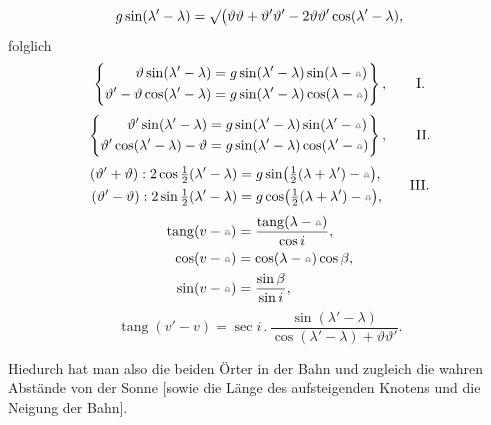 \[
g\sin(\lambda'-\lambda)=\surd\bigl(\vartheta\vartheta+\vartheta'\vartheta'-2\vartheta\vartheta'\cos(\lambda'-\lambda),
\]
\noindent folglich
\begin{equation}
\left\{\begin{aligned}
\vartheta\sin(\lambda'-\lambda)&=g\sin(\lambda'-\lambda)\sin(\lambda-\AstNode)\\
\vartheta'-\vartheta\cos(\lambda'-\lambda)&=g\sin(\lambda'-\lambda)\cos(\lambda-\AstNode)
\end{aligned}\right\},\tag*{I.}
\end{equation}
\begin{equation}
\left\{\begin{aligned}
\vartheta'\sin(\lambda'-\lambda)&=g\sin(\lambda'-\lambda)\sin(\lambda'-\AstNode)\\
\vartheta'\cos(\lambda'-\lambda)-\vartheta&=g\sin(\lambda'-\lambda)\cos(\lambda'-\AstNode)
\end{aligned}\right\},\tag*{II.}
\end{equation}
\begin{equation}
\begin{aligned}
(\vartheta'+\vartheta):2\cos\tfrac12(\lambda'-\lambda)&=g\sin\bigl(\tfrac12(\lambda+\lambda')-\AstNode\bigr),\\
(\vartheta'-\vartheta):2\sin\tfrac12(\lambda'-\lambda)&=g\cos\bigl(\tfrac12(\lambda+\lambda')-\AstNode\bigr),
\end{aligned}\tag*{III.}
\end{equation}
\[
\begin{aligned}
\operatorname{tang}(v-\AstNode)&=\frac{\operatorname{tang}(\lambda-\AstNode)}{\cos i},\\
\cos(v-\AstNode)&=\cos(\lambda-\AstNode)\cos\beta,\\
\sin(v-\AstNode)&=\frac{\sin\beta}{\sin i},
\end{aligned}
\]
\[
\operatorname{tang}(v'-v)=\sec i\mathbin{.}\frac{\sin(\lambda'-\lambda)}{\cos(\lambda'-\lambda)+\vartheta\vartheta'}.
\]

Hiedurch hat man also die beiden Örter in der Bahn und zugleich die wahren Abstände von der Sonne [sowie die Länge des aufsteigenden Knotens und die Neigung der Bahn].
\clearpage\endgroup
